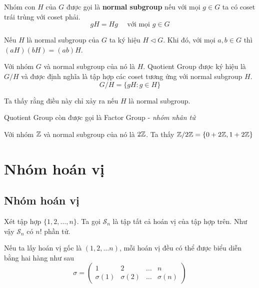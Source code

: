 \begin{definition}
    Nhóm con $H$ của $G$ được gọi là \textbf{normal subgroup} nếu với mọi $g \in G$ ta có coset trái trùng với coset phải.
    \begin{equation*}
        gH = Hg \quad \text{ với mọi } g \in G
    \end{equation*}
\end{definition}

Nếu $H$ là normal subgroup của $G$ ta ký hiệu $H \triangleleft G$. Khi đó, với mọi
$a, b \in G$ thì $(a H) (b H) = (ab) H$.

\begin{definition}
    Với nhóm $G$ và normal subgroup của nó là $H$.
    Quotient Group được ký hiệu là $G / H$ và được định nghĩa là tập hợp các coset tương ứng với normal subgroup $H$.
    \[G / H = \{gH : g \in H \}\]

    Ta thấy rằng điều này chỉ xảy ra nếu $H$ là normal subgroup.
\end{definition}

Quotient Group còn được gọi là Factor Group - \textit{nhóm nhân tử}

\begin{example}
    Với nhóm $\mathbb{Z}$ và normal subgroup của nó là $2\mathbb{Z}$.
    Ta thấy $\mathbb{Z} / 2 \mathbb{Z} = \{0 + 2 \mathbb{Z}, 1 + 2 \mathbb{Z}\}$
\end{example}

\section{Nhóm hoán vị}

\subsection*{Nhóm hoán vị}

Xét tập hợp $\{ 1, 2, \ldots, n \}$. Ta gọi $\mathcal{S}_n$ là tập tất cả hoán vị của tập hợp trên. Như vậy $\mathcal{S}_n$ có $n!$ phần tử.

Nếu ta lấy hoán vị gốc là $(1, 2, \ldots n)$, mỗi hoán vị đều có thể được biểu diễn bằng hai hàng như sau
\begin{equation*}
    \sigma = \begin{pmatrix}
        1 & 2 & \ldots & n \\
        \sigma(1) & \sigma(2) & \ldots & \sigma(n)
    \end{pmatrix}
\end{equation*}

